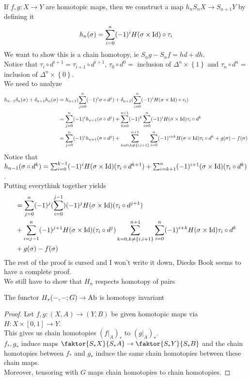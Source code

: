 \documentclass[../main.tex]{subfiles}
\begin{document}
If $f,g:X\to Y$ are homotopic maps, then we construct a map $h_nS_n X\to S_{n+1} Y$ by defining it
\[ 
h_n( \sigma) = \sum_{i=0}^{ n} ( -1)^{i}H( \sigma\times \operatorname{Id}) \circ \tau_i
\]
We want to show this is a chain homotopy, ie $S_n g -S_n f = hd + dh$.\\
Notice that $\tau_i \circ d^{i+1}= \tau_{i+1} \circ d^{i+1}$, $\tau_0\circ d^{0}= $ inclusion of $\Delta^{n}\times \left\{ 1 \right\} $ and $ \tau_n \circ d^{n}=$ inclusion of $\Delta^{n}\times \left\{ 0 \right\} $.\\
We need to analyze
\begin{align*}
h_{n-1} \delta_n ( \sigma) + \delta_{n+1} h_n( \sigma) &= h_{n+1} (  \sum_{j=0}^{ n}( -1)^{i}\sigma\circ d^{j}) + \delta_{n+1} ( \sum_{i=0}^{ n}( -1)^{i}H( \sigma\times \operatorname{Id}) \circ \tau_i) \\
						       &=  \sum_{j=0}^{ n}( -1)^{i}h_{n+1}(  \sigma\circ d^{j}) + \sum_{k=0}^{ n+1} ( -1)^{k} \sum_{i=0}^{ n}( -1)^{i}H( \sigma\times \operatorname{Id}) \tau_i \circ d^{k}\\
						       &=  \sum_{j=0}^{ n}( -1)^{i}h_{n+1}(  \sigma\circ d^{j}) + \sum_{k=0, k \neq \left\{ i,i+1 \right\} }^{ n+1}  \sum_{i=0}^{ n} ( -1)^{i+k}H( \sigma\times \operatorname{Id}) \tau_i \circ d^{k}+ g( \sigma) - f( \sigma) \\
\end{align*}
Notice that $h_{n-1} ( \sigma\circ d^{k}) = \sum_{i=0}^{ k-1}( -1)^{i}H( \sigma\times \operatorname{Id} )( \tau_i \circ d^{k+1}) + \sum_{i=k+1}^{ n} ( -1)^{i+1}( \sigma\times \operatorname{Id}) ( \tau_i \circ d^{k})  $.\\
Putting everythink together yields
\begin{align*}
						       &= \sum_{j=0}^{ n}( -1)^{j}( \sum_{i=0}^{ j-1}) ( -1)^{j}H( \sigma\times \operatorname{Id}) ( \tau_i \circ d^{j+1}) \\
						       &+ \sum_{i=j-1}^{ n} ( -1)^{j+1}H( \sigma\times \operatorname{Id}) ( \tau_i \circ d^{j}) \sum_{k=0, k \neq \left\{ i,i+1 \right\} }^{ n+1}  \sum_{i=0}^{ n} ( -1)^{i+k}H( \sigma\times \operatorname{Id}) \tau_i \circ d^{k}\\
						       &+ g( \sigma) - f( \sigma) \\
\end{align*}
The rest of the proof is cursed and I won't write it down, Diecks Book seems to have a complete proof.\\
We still have to show that $H_n$ respects homotopy of pairs
\begin{propo}
The functor $H_\ast( -,-;G) \to \operatorname{Ab}$ is homotopy invariant
\end{propo}
\begin{proof}
Let $f,g:( X,A) \to ( Y,B) $ be given homotopic maps via $H:X\times [ 0,1] \to Y$.\\
This gives us chain homotopies $( f|_A) _\ast$ to $( g|_A)_\ast$.\\
$f_\ast,g_\ast$ induce maps $ \faktor{S_\ast X}{S_\ast A} \to \faktor{S_\ast Y}{S_\ast B}$ and the chain homotopies between $f_\ast$ and $g_\ast$ induce the same chain homotopies between these chain maps.\\
Moreover, tensoring with $G$ maps chain homotopies to chain homotopies.
\end{proof}
\end{document}
